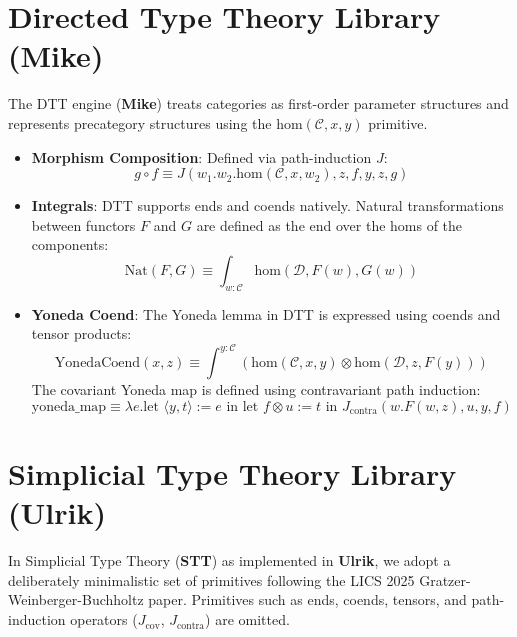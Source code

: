 \documentclass[11pt]{article}
\newcommand{\catC}{\mathcal{C}}
\newcommand{\catD}{\mathcal{D}}
\newcommand{\homtype}[3]{\text{hom}(#1, #2, #3)}
\newcommand{\mike}[0]{\textbf{Mike}}
\newcommand{\ulrik}[0]{\textbf{Ulrik}}
\newcommand{\stt}[0]{\textbf{STT}}
\begin{document}
\section{Directed Type Theory Library (Mike)}

The DTT engine (\mike{}) treats categories as first-order parameter structures and represents precategory structures using the $\homtype{\catC}{x}{y}$ primitive.
\begin{itemize}
    \item \textbf{Morphism Composition}: Defined via path-induction $J$:
    \begin{equation}
        g \circ f \equiv J(w_1.w_2.\homtype{\catC}{x}{w_2}, z, f, y, z, g)
    \end{equation}
    \item \textbf{Integrals}: DTT supports ends and coends natively. Natural transformations between functors $F$ and $G$ are defined as the end over the homs of the components:
    \begin{equation}
        \text{Nat}(F, G) \equiv \int_{w:\catC} \homtype{\catD}{F(w)}{G(w)}
    \end{equation}
    \item \textbf{Yoneda Coend}: The Yoneda lemma in DTT is expressed using coends and tensor products:
    \begin{equation}
        \text{YonedaCoend}(x, z) \equiv \int^{y:\catC} (\homtype{\catC}{x}{y} \otimes \homtype{\catD}{z}{F(y)})
    \end{equation}
    The covariant Yoneda map is defined using contravariant path induction:
    \begin{equation}
        \text{yoneda\_map} \equiv \lambda e. \text{let } \langle y, t \rangle := e \text{ in let } f \otimes u := t \text{ in } J_\text{contra}(w.F(w, z), u, y, f)
    \end{equation}
\end{itemize}

\section{Simplicial Type Theory Library (Ulrik)}

In Simplicial Type Theory (\stt{}) as implemented in \ulrik{}, we adopt a deliberately minimalistic set of primitives following the LICS 2025 Gratzer-Weinberger-Buchholtz paper. Primitives such as ends, coends, tensors, and path-induction operators ($J_\text{cov}$, $J_\text{contra}$) are omitted.
\end{document}

